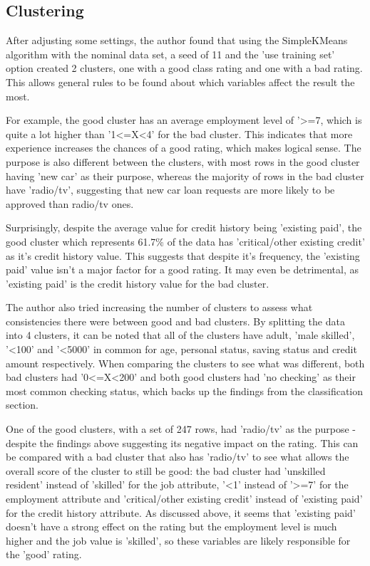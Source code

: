 \documentclass[runningheads, 12pt]{llncs}
\begin{document}
\subsection{Clustering}
After adjusting some settings, the author found that using the SimpleKMeans algorithm with the nominal data set, a seed of 11 and the 'use training set' option created 2 clusters, one with a good class rating and one with a bad rating. This allows general rules to be found about which variables affect the result the most.

For example, the good cluster has an average employment level of '\textgreater=7, which is quite a lot higher than '1\textless=X\textless4' for the bad cluster. This indicates that more experience increases the chances of a good rating, which makes logical sense. The purpose is also different between the clusters, with most rows in the good cluster having 'new car' as their purpose, whereas the majority of rows in the bad cluster have 'radio/tv', suggesting that new car loan requests are more likely to be approved than radio/tv ones.

Surprisingly, despite the average value for credit history being 'existing paid', the good cluster which represents 61.7\% of the data has 'critical/other existing credit' as it's credit history value. This suggests that despite it's frequency, the 'existing paid' value isn't a major factor for a good rating. It may even be detrimental, as 'existing paid' is the credit history value for the bad cluster.

The author also tried increasing the number of clusters to assess what consistencies there were between good and bad clusters. By splitting the data into 4 clusters, it can be noted that all of the clusters have adult, 'male skilled', '\textless100' and '\textless5000' in common for age, personal status, saving status and credit amount respectively. When comparing the clusters to see what was different, both bad clusters had '0\textless=X\textless200' and both good clusters had 'no checking' as their most common checking status, which backs up the findings from the classification section.

One of the good clusters, with a set of 247 rows, had 'radio/tv' as the purpose - despite the findings above suggesting its negative impact on the rating. This can be compared with a bad cluster that also has 'radio/tv' to see what allows the overall score of the cluster to still be good: the bad cluster had 'unskilled resident' instead of 'skilled' for the job attribute, '\textless1' instead of '\textgreater=7' for the employment attribute and 'critical/other existing credit' instead of 'existing paid' for the credit history attribute. As discussed above, it seems that 'existing paid' doesn't have a strong effect on the rating but the employment level is much higher and the job value is 'skilled', so these variables are likely responsible for the 'good' rating. 
\end{document}
